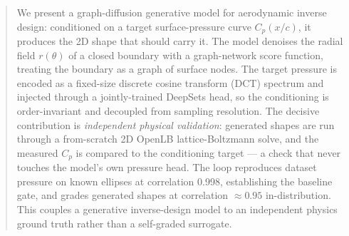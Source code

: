 \begin{abstract}
We present a graph-diffusion generative model for aerodynamic inverse design: conditioned on a
target surface-pressure curve $C_p(x/c)$, it produces the 2D shape that should carry it. The model
denoises the radial field $r(\theta)$ of a closed boundary with a graph-network score function,
treating the boundary as a graph of surface nodes. The target pressure is encoded as a fixed-size
discrete cosine transform (DCT) spectrum and injected through a jointly-trained DeepSets head, so
the conditioning is order-invariant and decoupled from sampling resolution. The decisive
contribution is \emph{independent physical validation}: generated shapes are run through a
from-scratch 2D OpenLB lattice-Boltzmann solve, and the measured $C_p$ is compared to the
conditioning target --- a check that never touches the model's own pressure head. The loop
reproduces dataset pressure on known ellipses at correlation 0.998, establishing the baseline gate,
and grades generated shapes at correlation $\approx 0.95$ in-distribution. This couples a
generative inverse-design model to an independent physics ground truth rather than a self-graded
surrogate.
\end{abstract}
